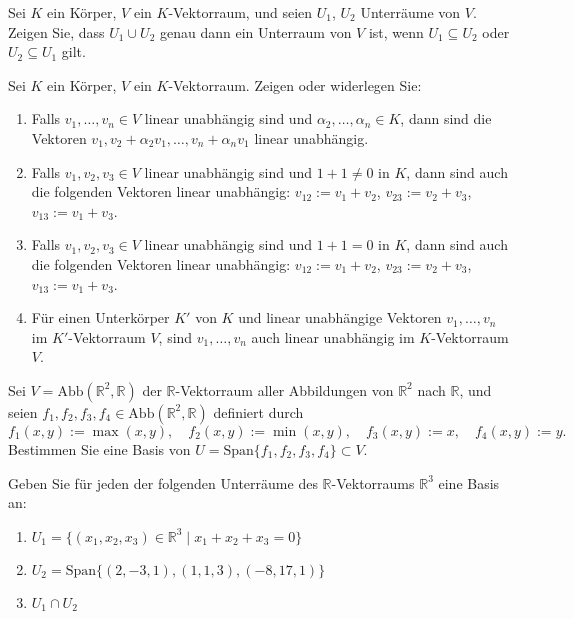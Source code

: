 \documentclass{../problemset}
\author{Your Name}
\begin{document}
\maketitle

\begin{problem}
Sei $K$ ein Körper, $V$ ein $K$-Vektorraum, und seien $U_1$, $U_2$ Unterräume von $V$. Zeigen Sie, dass $U_1 \cup U_2$ genau dann ein Unterraum von $V$ ist, wenn $U_1 \subseteq U_2$ oder $U_2 \subseteq U_1$ gilt.
\end{problem}

\begin{problem}
Sei $K$ ein Körper, $V$ ein $K$-Vektorraum. Zeigen oder widerlegen Sie:
\begin{enumerate}
    \item Falls $v_1, \ldots, v_n \in V$ linear unabhängig sind und $\alpha_2, \ldots, \alpha_n \in K$, dann sind die Vektoren $v_1, v_2 + \alpha_2v_1, \ldots, v_n + \alpha_nv_1$ linear unabhängig.
    \item Falls $v_1, v_2, v_3 \in V$ linear unabhängig sind und $1 + 1 \neq 0$ in $K$, dann sind auch die folgenden Vektoren linear unabhängig: $v_{12} := v_1 + v_2$, $v_{23} := v_2 + v_3$, $v_{13} := v_1 + v_3$.
    \item Falls $v_1, v_2, v_3 \in V$ linear unabhängig sind und $1 + 1 = 0$ in $K$, dann sind auch die folgenden Vektoren linear unabhängig: $v_{12} := v_1 + v_2$, $v_{23} := v_2 + v_3$, $v_{13} := v_1 + v_3$.
    \item Für einen Unterkörper $K'$ von $K$ und linear unabhängige Vektoren $v_1, \ldots, v_n$ im $K'$-Vektorraum $V$, sind $v_1, \ldots, v_n$ auch linear unabhängig im $K$-Vektorraum $V$.
\end{enumerate}
\end{problem}

\begin{problem}
Sei $V = \text{Abb}(\mathbb{R}^2, \mathbb{R})$ der $\mathbb{R}$-Vektorraum aller Abbildungen von $\mathbb{R}^2$ nach $\mathbb{R}$, und seien $f_1, f_2, f_3, f_4 \in \text{Abb}(\mathbb{R}^2, \mathbb{R})$ definiert durch
\[ f_1(x, y) := \max(x, y), \quad f_2(x, y) := \min(x, y), \quad f_3(x, y) := x, \quad f_4(x, y) := y. \]
Bestimmen Sie eine Basis von $U = \text{Span}\{f_1, f_2, f_3, f_4\} \subset V$.
\end{problem}

\pagebreak

\begin{problem}
Geben Sie für jeden der folgenden Unterräume des $\mathbb{R}$-Vektorraums $\mathbb{R}^3$ eine Basis an:
\begin{enumerate}
    \item $U_1 = \{(x_1, x_2, x_3) \in \mathbb{R}^3 \mid x_1 + x_2 + x_3 = 0\}$
    \item $U_2 = \text{Span}\{(2, -3, 1), (1, 1, 3), (-8, 17, 1)\}$
    \item $U_1 \cap U_2$
\end{enumerate}
\end{problem}
\end{document}
